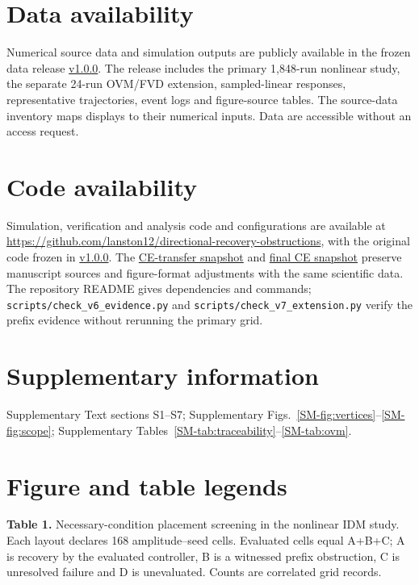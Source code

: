 \documentclass[12pt]{article}
\begin{document}
\section*{Data availability}
Numerical source data and simulation outputs are publicly available in the frozen data release \href{https://github.com/lanston12/directional-recovery-obstructions/releases/tag/v1.0.0}{v1.0.0}. The release includes the primary 1,848-run nonlinear study, the separate 24-run OVM/FVD extension, sampled-linear responses, representative trajectories, event logs and figure-source tables. The source-data inventory maps displays to their numerical inputs. Data are accessible without an access request.

\section*{Code availability}
Simulation, verification and analysis code and configurations are available at \url{https://github.com/lanston12/directional-recovery-obstructions}, with the original code frozen in \href{https://github.com/lanston12/directional-recovery-obstructions/releases/tag/v1.0.0}{v1.0.0}. The \href{https://github.com/lanston12/directional-recovery-obstructions/releases/tag/v1.0.1-ce-transfer}{CE-transfer snapshot} and \href{https://github.com/lanston12/directional-recovery-obstructions/releases/tag/v1.0.2-ce-final}{final CE snapshot} preserve manuscript sources and figure-format adjustments with the same scientific data. The repository README gives dependencies and commands; \texttt{scripts/check\_v6\_evidence.py} and \texttt{scripts/check\_v7\_extension.py} verify the prefix evidence without rerunning the primary grid.

\FloatBarrier
\section*{Supplementary information}
Supplementary Text sections S1--S7; Supplementary Figs.~\ref{SM-fig:vertices}--\ref{SM-fig:scope}; Supplementary Tables~\ref{SM-tab:traceability}--\ref{SM-tab:ovm}.


\begingroup\footnotesize

\endgroup
\clearpage
\section*{Figure and table legends}
\noindent\textbf{Table 1.} Necessary-condition placement screening in the nonlinear IDM study. Each layout declares 168 amplitude--seed cells. Evaluated cells equal A+B+C; A is recovery by the evaluated controller, B is a witnessed prefix obstruction, C is unresolved failure and D is unevaluated. Counts are correlated grid records.
\end{document}

